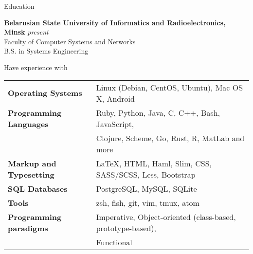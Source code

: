 \documentclass{resume} %
\begin{document}

\begin{rSection}{Education}

{\bf Belarusian State University of Informatics and Radioelectronics, Minsk} \hfill {\em  present} \\
Faculty of Computer Systems and Networks \\
B.S. in Systems Engineering

\end{rSection}


\begin{rSection}{Have experience with}

\begin{tabular}{ @{} >{\bfseries}l @{\hspace{6ex}} l }
Operating Systems     & Linux (Debian, CentOS, Ubuntu), Mac OS X, Android \\
Programming Languages & Ruby, Python, Java, C, C++, Bash, JavaScript,  \\
                      & Clojure, Scheme, Go, Rust, R, MatLab and more\smallskip \\
Markup and Typesetting & \LaTeX, HTML, Haml, Slim, CSS, SASS/SCSS, Less, Bootstrap \smallskip \\
SQL Databases & PostgreSQL, MySQL, SQLite \smallskip \\
Tools & zsh, fish, git, vim, tmux, atom \smallskip \\
Programming paradigms & Imperative, Object-oriented (class-based, prototype-based), \\
                      & Functional
\end{tabular}

\end{rSection}

\end{document}
